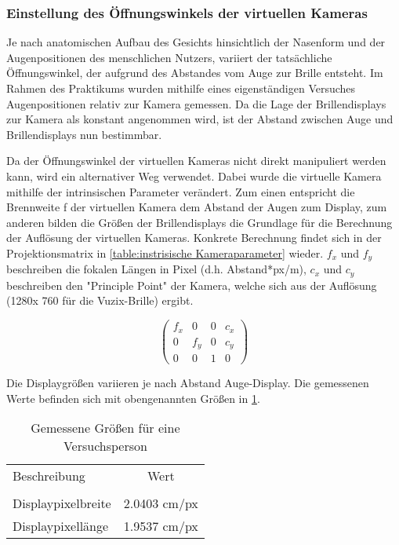 \subsubsection{Einstellung des Öffnungswinkels der virtuellen Kameras}
\label{sec:virtuelle Kameras}

Je nach anatomischen Aufbau des Gesichts hinsichtlich  der Nasenform und der Augenpositionen des menschlichen Nutzers, variiert der tatsächliche Öffnungswinkel, der aufgrund des Abstandes vom Auge zur Brille entsteht. Im Rahmen des Praktikums wurden mithilfe eines eigenständigen Versuches Augenpositionen relativ zur Kamera gemessen. Da die Lage der Brillendisplays zur Kamera als konstant angenommen wird, ist der Abstand zwischen Auge und Brillendisplays nun bestimmbar.

Da der Öffnungswinkel der virtuellen Kameras nicht direkt manipuliert werden kann, wird ein alternativer Weg verwendet. Dabei wurde die virtuelle Kamera mithilfe der intrinsischen Parameter verändert. Zum einen entspricht die Brennweite f der virtuellen Kamera dem Abstand der Augen zum Display, zum anderen bilden die Größen der Brillendisplays die Grundlage für die Berechnung der Auflösung der virtuellen Kameras. Konkrete Berechnung findet sich in der Projektionsmatrix in \ref{table:instrisische Kameraparameter} wieder. $f_x$ und $f_y$ beschreiben die fokalen Längen in Pixel (d.h. Abstand*px/m), $c_x$ und $c_y$ beschreiben den "Principle Point" der Kamera, welche sich aus der Auflösung (1280x 760 für die Vuzix-Brille) ergibt. 

%

\begin{equation}
\begin{pmatrix}
f_x & 0& 0& c_x \\
0 & f_y & 0 & c_y\\ 
0 & 0&   1 & 0  
\end{pmatrix}
\label{table:instrisische Kameraparameter}
\end{equation}

Die Displaygrößen variieren je nach Abstand Auge-Display. Die gemessenen Werte befinden sich mit obengenannten Größen in \ref{table:Messwerte DisplayAuge}.
%
 \begin{table}[ht]

 \begin{tabular}{lc} 
  Beschreibung & Wert \\ \\
  Displaypixelbreite & 2.0403 cm/px \\
  Displaypixellänge &  1.9537 cm/px \\
 \end{tabular}
 \caption{Gemessene Größen für eine Versuchsperson}
 \label{table:Messwerte DisplayAuge}
 \end{table}



